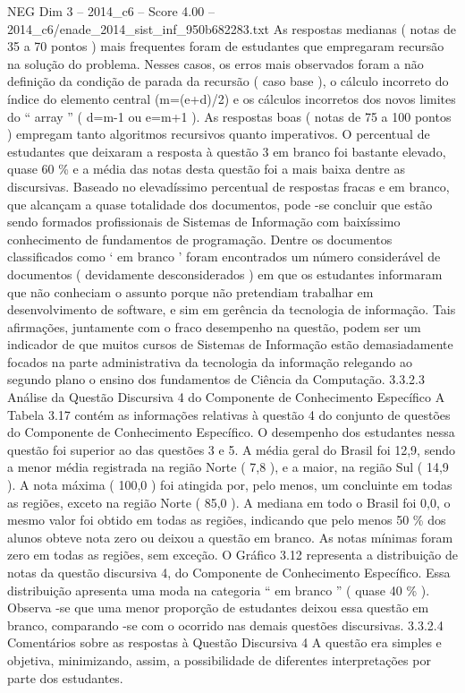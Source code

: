 \begin{textsample}{NEG Dim 3 – 2014\_c6 – Score 4.00 – 2014\_c6/enade\_2014\_sist\_inf\_950b682283.txt}
As respostas medianas ( notas de 35 a 70 pontos ) mais frequentes foram de estudantes que empregaram recursão na solução do problema.
Nesses casos, os erros mais observados foram a não definição da condição de parada da recursão ( caso base ), o cálculo incorreto do índice do elemento central (m=(e+d)/2) e os cálculos incorretos dos novos limites do “ array ” ( d=m-1 ou e=m+1 ).
As respostas boas ( notas de 75 a 100 pontos ) empregam tanto algoritmos recursivos quanto imperativos.
O percentual de estudantes que deixaram a resposta à questão 3 em branco foi bastante elevado, quase 60 \% e a média das notas desta questão foi a mais baixa dentre as discursivas.
Baseado no elevadíssimo percentual de respostas fracas e em branco, que alcançam a quase totalidade dos documentos, pode -se concluir que estão sendo formados profissionais de Sistemas de Informação com baixíssimo conhecimento de fundamentos de programação.
Dentre os documentos classificados como ‘ em branco ’ foram encontrados um número considerável de documentos ( devidamente desconsiderados ) em que os estudantes informaram que não conheciam o assunto porque não pretendiam trabalhar em desenvolvimento de software, e sim em gerência da tecnologia de informação.
Tais afirmações, juntamente com o fraco desempenho na questão, podem ser um indicador de que muitos cursos de Sistemas de Informação estão demasiadamente focados na parte administrativa da tecnologia da informação relegando ao segundo plano o ensino dos fundamentos de Ciência da Computação. 3.3.2.3 Análise da Questão Discursiva 4 do Componente de Conhecimento Específico A Tabela 3.17 contém as informações relativas à questão 4 do conjunto de questões do Componente de Conhecimento Específico.
O desempenho dos estudantes nessa questão foi superior ao das questões 3 e 5.
A média geral do Brasil foi 12,9, sendo a menor média registrada na região Norte ( 7,8 ), e a maior, na região Sul ( 14,9 ).
A nota máxima ( 100,0 ) foi atingida por, pelo menos, um concluinte em todas as regiões, exceto na região Norte ( 85,0 ).
A mediana em todo o Brasil foi 0,0, o mesmo valor foi obtido em todas as regiões, indicando que pelo menos 50 \% dos alunos obteve nota zero ou deixou a questão em branco.
As notas mínimas foram zero em todas as regiões, sem exceção.
O Gráfico 3.12 representa a distribuição de notas da questão discursiva 4, do Componente de Conhecimento Específico.
Essa distribuição apresenta uma moda na categoria “ em branco ” ( quase 40 \% ).
Observa -se que uma menor proporção de estudantes deixou essa questão em branco, comparando -se com o ocorrido nas demais questões discursivas. 3.3.2.4 Comentários sobre as respostas à Questão Discursiva 4 A questão era simples e objetiva, minimizando, assim, a possibilidade de diferentes interpretações por parte dos estudantes.

\end{textsample}
